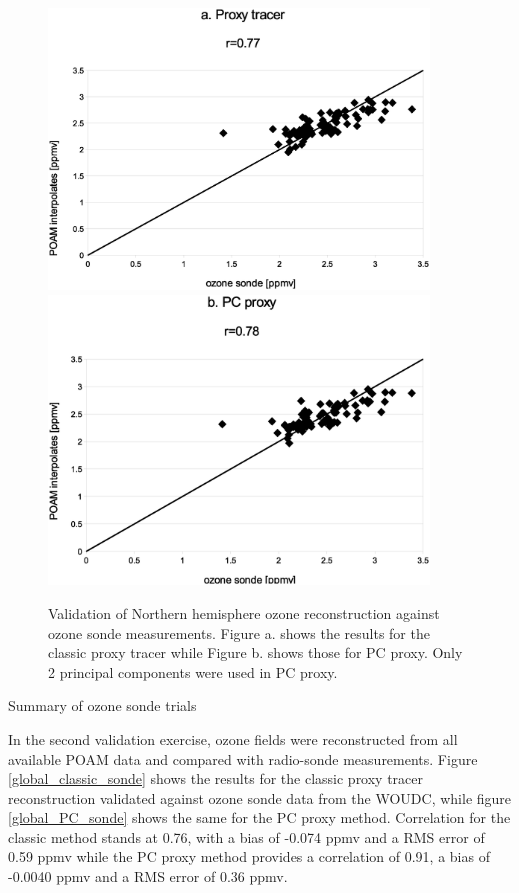 \begin{figure}
  \centering
  \includegraphics[width=0.9\textwidth]{Nhemi_classic_sonde}
  \includegraphics[width=0.9\textwidth]{Nhemi_PC_sonde}
  \caption{Validation of Northern hemisphere ozone reconstruction against ozone sonde measurements. 
  Figure a. shows the results for the classic proxy tracer while Figure b. shows those for PC proxy.
  Only 2 principal components were used in PC proxy.}
  \label{Nhemi_sonde}
\end{figure}

\begin{table}
	\caption{Summary of ozone sonde trials}
	\label{summary}
	
\end{table}

In the second validation exercise, ozone fields were reconstructed from 
all available POAM data and compared with radio-sonde measurements.
Figure \ref{global_classic_sonde} shows the results for the classic proxy
tracer reconstruction validated against ozone sonde data from the WOUDC,
while figure \ref{global_PC_sonde} shows the same for the PC proxy method.
Correlation for the classic method stands at 0.76, with a bias of -0.074 ppmv
and a RMS error of 0.59 ppmv while the PC proxy method provides a correlation
of 0.91, a bias of -0.0040 ppmv and a RMS error of 0.36 ppmv.

